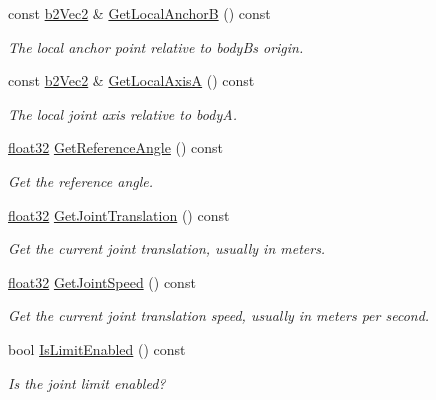 \begin{DoxyCompactItemize}
const \mbox{\hyperlink{structb2_vec2}{b2\+Vec2}} \& \mbox{\hyperlink{classb2_prismatic_joint_ab9c2a0fbf075454320e87648750668b0}{Get\+Local\+AnchorB}} () const
\begin{DoxyCompactList}\small\item\em The local anchor point relative to bodyB\textquotesingle{}s origin. \end{DoxyCompactList}\item 
const \mbox{\hyperlink{structb2_vec2}{b2\+Vec2}} \& \mbox{\hyperlink{classb2_prismatic_joint_a54d51d09f3c327c5c4238e054e2a3a76}{Get\+Local\+AxisA}} () const
\begin{DoxyCompactList}\small\item\em The local joint axis relative to bodyA. \end{DoxyCompactList}\item 
\mbox{\hyperlink{b2_settings_8h_aacdc525d6f7bddb3ae95d5c311bd06a1}{float32}} \mbox{\hyperlink{classb2_prismatic_joint_a7b40d88d1bdb18089803d5abc6ba67c5}{Get\+Reference\+Angle}} () const
\begin{DoxyCompactList}\small\item\em Get the reference angle. \end{DoxyCompactList}\item 
\mbox{\hyperlink{b2_settings_8h_aacdc525d6f7bddb3ae95d5c311bd06a1}{float32}} \mbox{\hyperlink{classb2_prismatic_joint_abb008b99fb2df7357e6f3166d3c8b192}{Get\+Joint\+Translation}} () const
\begin{DoxyCompactList}\small\item\em Get the current joint translation, usually in meters. \end{DoxyCompactList}\item 
\mbox{\hyperlink{b2_settings_8h_aacdc525d6f7bddb3ae95d5c311bd06a1}{float32}} \mbox{\hyperlink{classb2_prismatic_joint_af407d14ac024abdee49b852613f1bbc2}{Get\+Joint\+Speed}} () const
\begin{DoxyCompactList}\small\item\em Get the current joint translation speed, usually in meters per second. \end{DoxyCompactList}\item 
bool \mbox{\hyperlink{classb2_prismatic_joint_a22e2442a17832f718447c63c9c6263c8}{Is\+Limit\+Enabled}} () const
\begin{DoxyCompactList}\small\item\em Is the joint limit enabled? \end{DoxyCompactList}\item 

\end{DoxyCompactItemize}
